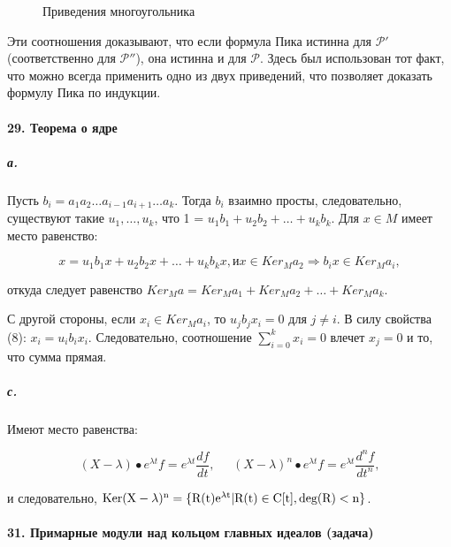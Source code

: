 {\begin{figure}[h]
\caption{Приведения многоугольника}
\end{figure}



\noindent Эти соотношения доказывают, что если формула Пика истинна для $\mathcal{P}'$ (соответственно для $\mathcal{P}''$), она истинна и для $\mathcal{P}$. Здесь был использован тот факт, что можно всегда применить одно из двух приведений, что позволяет доказать формулу Пика по индукции.

\paragraph{29. Теорема о ядре}

\subparagraph{а.} Пусть $b_{i} = a_{1}a_{2}\ldots a_{i-1}a_{i+1}\ldots a_{k}$. Тогда $b_{i}$ взаимно просты, следовательно, существуют такие $u_{1},\ldots,u_{k}$, что 1 = $u_{1}b_{1}+u_{2}b_{2}+\dots+u_{k}b_{k}$. Для $x \in M$ имеет место равенство:

\begin{equation}
x = u_{1}b_{1}x + u_{2}b_{2}x +\dots+ u_{k}b_{k}x, \text{и} x \in Ker_{M} a_{2} \Rightarrow b_{i}x \in Ker_{M} a_{i},
\end{equation}

\noindent откуда следует равенство $Ker_{M} a = Ker_{M} a_{1} + Ker_{M} a_{2} +\dots+ Ker_{M} a_{k}$.

С другой стороны, если $x_{i} \in Ker_{M} a_{i}$, то $u_{j}b_{j}x_{i} = 0$ для $j \neq i$. В силу свойства (8): $x_{i} = u_{i}b_{i}x_{i}$. Следовательно, соотношение $\sum_{i = 0}^{k}x_{i} = 0$ влечет $x_{j} = 0$ и то, что сумма прямая.




\subparagraph{с.} Имеют место равенства:

\begin{equation*}
(X - \lambda) \bullet e^{\lambda t}f = e^{\lambda t}\frac{df}{dt},\;\;\;\;\; (X - \lambda)^{n} \bullet e^{\lambda t}f = e^{\lambda t}\frac{d^{n}f}{dt^{n}},
\end{equation*}

\noindent и следовательно, $\rm{Ker}(X - \lambda)^{n} = \{R(t)e^{\lambda t} | R(t) \in C[t], deg(R) < n\}$.

\paragraph{31. Примарные модули над кольцом главных идеалов (задача)}

}
